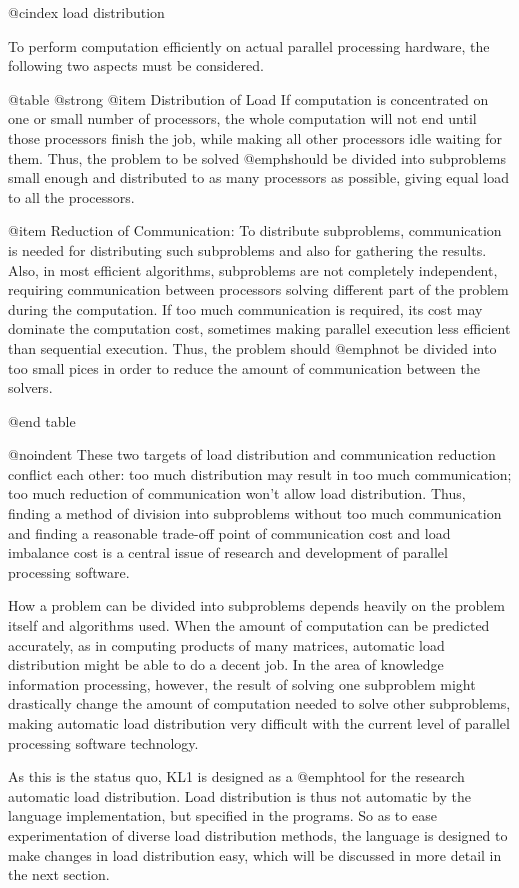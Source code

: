 {@cindex load distribution

To perform computation efficiently on actual parallel processing
hardware, the following two aspects must be considered.

@table @strong
@item Distribution of Load
If computation is concentrated on one or small number of processors, the
whole computation will not end until those processors finish the job,
while making all other processors idle waiting for them.  Thus, the
problem to be solved @emph{should} be divided into subproblems small
enough and distributed to as many processors as possible, giving equal
load to all the processors.

@item Reduction of Communication:
To distribute subproblems, communication is needed for distributing such
subproblems and also for gathering the results.  Also, in most efficient
algorithms, subproblems are not completely independent, requiring
communication between processors solving different part of the problem
during the computation.  If too much communication is required, its cost
may dominate the computation cost, sometimes making parallel execution
less efficient than sequential execution.  Thus, the problem should
@emph{not} be divided into too small pices in order to reduce the amount
of communication between the solvers.

@end table

@noindent
These two targets of load distribution and communication reduction
conflict each other: too much distribution may result in too much
communication; too much reduction of communication won't allow load
distribution.  Thus, finding a method of division into subproblems
without too much communication and finding a reasonable trade-off point
of communication cost and load imbalance cost is a central issue of
research and development of parallel processing software.

How a problem can be divided into subproblems depends heavily on the
problem itself and algorithms used.  When the amount of computation can
be predicted accurately, as in computing products of many matrices,
automatic load distribution might be able to do a decent job.  In the
area of knowledge information processing, however, the result of solving
one subproblem might drastically change the amount of computation needed
to solve other subproblems, making automatic load distribution very
difficult with the current level of parallel processing software
technology.

As this is the status quo, KL1 is designed as a @emph{tool} for the
research automatic load distribution.  Load distribution is thus not
automatic by the language implementation, but specified in the programs.
So as to ease experimentation of diverse load distribution methods, the
language is designed to make changes in load distribution easy, which
will be discussed in more detail in the next section.

}
